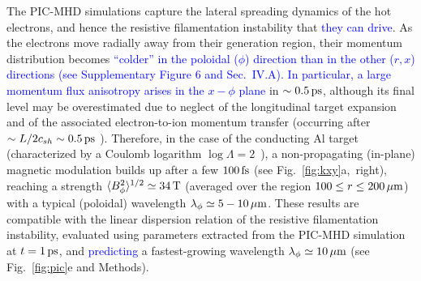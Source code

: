 \documentclass[aps,showpacs,superscriptaddress]{revtex4}
\begin{document}
The PIC-MHD simulations capture the lateral spreading dynamics of the hot electrons, and hence the resistive filamentation instability that \textcolor{blue}{they can drive}. As the electrons move radially away from their generation region, their momentum distribution becomes \textcolor{blue}{``colder'' in the poloidal ($\phi$) direction than in the other ($r,x$) directions (see Supplementary Figure 6 and Sec.~IV.A). In particular, a large momentum flux anisotropy arises in the $x-\phi$ plane} in $\sim 0.5\,\rm ps$, although its final level may be overestimated due to neglect of the longitudinal target expansion and of the associated electron-to-ion momentum transfer (occurring after $\sim L/2c_{sh} \sim 0.5\,\rm ps$ \cite{PRE_Mora_2005}). Therefore, in the case of the conducting Al target (characterized by a Coulomb logarithm $\log \Lambda = 2$~\cite{POF_Lee_1984}), a non-propagating (in-plane) magnetic modulation builds up after a few $100\,\rm fs$ (see \mbox{Fig.~\ref{fig:kxy}a, right}), reaching a strength $\langle B_\phi^2\rangle^{1/2}\simeq 34\,\rm T$ (averaged over the region $100 \le r \le 200\,\mu \rm m$) with a typical (poloidal) wavelength $\lambda_\phi \simeq 5-10\,\rm \mu m$. These results are compatible with the linear dispersion relation of the resistive filamentation instability, evaluated using parameters extracted from the PIC-MHD simulation at $t=1\,\rm ps$, and \textcolor{blue}{predicting} a fastest-growing wavelength $\lambda_\phi \simeq 10\,\mu \rm m$ (see Fig.~\ref{fig:pic}e and Methods). 
\end{document}
